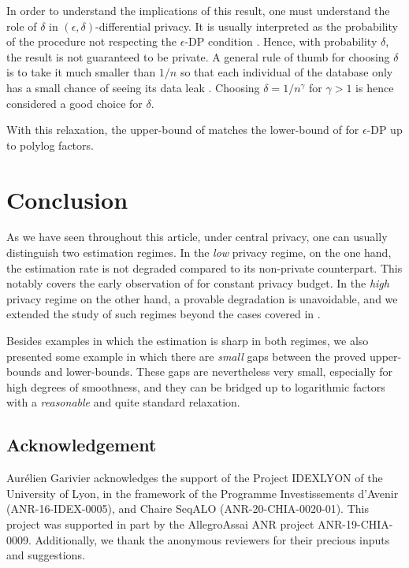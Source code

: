 \documentclass[10pt]{article} %
\newcommand\B[1]{{#1}}
\begin{document}
In order to understand the implications of this result, one must understand the role of $\delta$ in $(\epsilon, \delta)$-differential privacy. It is usually interpreted as the probability of the procedure not respecting the $\epsilon$-DP condition \citep{dwork2014algorithmic}. Hence, with probability $\delta$, the result is not guaranteed to be private. A general rule of thumb for choosing $\delta$ is to take it much smaller than $1/n$ so that each individual of the database only has a small chance of seeing its data leak \citep{dwork2014algorithmic}. Choosing $\delta = 1/n^\gamma$ for $\gamma > 1$ is hence considered a good choice for $\delta$.

With this relaxation, the upper-bound of  matches the lower-bound of  for $\epsilon$-DP up to polylog factors.

\section{Conclusion}\label{sec:ccl}

As we have seen throughout this article, under \B{central} privacy, one can usually distinguish two estimation regimes. In the \emph{low} privacy regime, on the one hand, the estimation rate is not degraded compared to its non-private counterpart. This notably covers the early observation of \citet{wasserman2010statistical} for constant privacy budget. 
In the \emph{high} privacy regime on the other hand, a provable degradation is unavoidable,  %
and we extended the study of such regimes beyond the cases covered in \citet{barber2014privacy}.

Besides examples in which the estimation is sharp in both regimes, we also presented some example in which there are \emph{small} gaps between the proved upper-bounds and lower-bounds. These gaps are nevertheless very small, especially for high degrees of smoothness, and they can be bridged up to logarithmic factors with a \emph{reasonable} and quite standard relaxation.



\subsection*{Acknowledgement}
Aurélien Garivier acknowledges the support of the Project IDEXLYON of the University of Lyon, in the framework of the Programme 
Investissements d'Avenir (ANR-16-IDEX-0005), and Chaire SeqALO (ANR-20-CHIA-0020-01).
This project was supported in part by the AllegroAssai ANR project ANR-19-CHIA-0009.
Additionally, we thank the anonymous reviewers for their precious inputs and suggestions.
\end{document}
